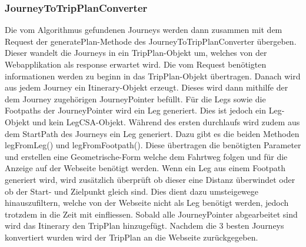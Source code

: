 \subsubsection{JourneyToTripPlanConverter}
Die vom Algorithmus gefundenen Journeys werden dann zusammen mit dem Request der generatePlan-Methode des JourneyToTripPlanConverter übergeben. Dieser wandelt die Journeys in ein TripPlan-Objekt um, welches von der Webapplikation als response erwartet wird.
Die vom Request benötigten informationen werden zu beginn in das TripPlan-Objekt übertragen. Danach wird aus jedem Journey ein Itinerary-Objekt erzeugt. Dieses wird dann mithilfe der dem Journey zugehörigen JourneyPointer befüllt. Für die Legs sowie die Footpaths der JourneyPointer wird ein Leg generiert. Dies ist jedoch ein Leg-Objekt und kein LegCSA-Objekt. Während des ersten durchlaufs wird zudem aus dem StartPath des Journeys ein Leg generiert. Dazu gibt es die beiden Methoden legFromLeg() und legFromFootpath(). Diese übertragen die benötigten Parameter und erstellen eine Geometrische-Form welche dem Fahrtweg folgen und für die Anzeige auf der Webseite benötigt werden. Wenn ein Leg aus einem Footpath generiert wird, wird zusätzlich überprüft ob dieser eine Distanz überwindet oder ob der Start- und Zielpunkt gleich sind. Dies dient dazu umsteigewege hinauszufiltern, welche von der Webseite nicht als Leg benötigt werden, jedoch trotzdem in die Zeit mit einfliessen. Sobald alle JourneyPointer abgearbeitet sind wird das Itinerary den TripPlan hinzugefügt. Nachdem die 3 besten Journeys konvertiert wurden wird der TripPlan an die Webseite zurückgegeben.
